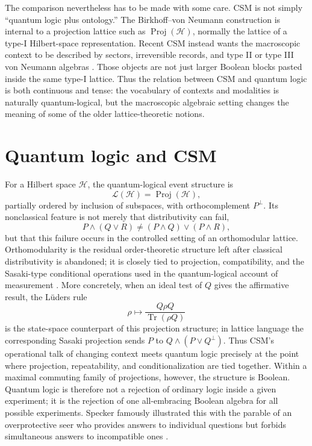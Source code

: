 \documentclass[
aps,
pra,
reprint,
superscriptaddress,
nofootinbib,
longbibliography
]{revtex4-2}
\newcommand{\Hilb}{\mathcal H}
\newcommand{\Proj}{\operatorname{Proj}}
\newcommand{\Lat}{\mathcal L}
\begin{document}
The comparison nevertheless has to be made with some care.  CSM is not simply
``quantum logic plus ontology.''  The Birkhoff--von Neumann construction is
internal to a projection lattice such as $\Proj(\Hilb)$, normally the lattice
of a type-I Hilbert-space representation.  Recent CSM instead wants the
macroscopic context to be described by sectors, irreversible records, and
type II or type III von Neumann algebras \cite{haag1996,takesaki1979}.  Those
objects are not just larger Boolean blocks pasted inside the same type-I
lattice.  Thus the relation between CSM and quantum logic is both continuous
and tense: the vocabulary of contexts and modalities is naturally
quantum-logical, but the macroscopic algebraic setting changes the meaning of
some of the older lattice-theoretic notions.

\section{Quantum logic and CSM}

For a Hilbert space $\Hilb$, the quantum-logical event structure is
\begin{equation}
\Lat(\Hilb)=\Proj(\Hilb),
\end{equation}
partially ordered by inclusion of subspaces, with orthocomplement $P^\perp$.
Its nonclassical feature is not merely that distributivity can fail,
\begin{equation}
P\wedge(Q\vee R)\neq (P\wedge Q)\vee(P\wedge R),
\end{equation}
but that this failure occurs in the controlled setting of an orthomodular
lattice.  Orthomodularity is the residual order-theoretic structure left after
classical distributivity is abandoned; it is closely tied to projection,
compatibility, and the Sasaki-type conditional operations used in the
quantum-logical account of measurement \cite{kalmbach1983,ptak1991}.  More
concretely, when an ideal test of $Q$ gives the affirmative result, the
L\"uders rule
\begin{equation}
\rho\mapsto \frac{Q\rho Q}{\operatorname{Tr}(\rho Q)}
\end{equation}
is the state-space counterpart of this projection structure; in lattice
language the corresponding Sasaki projection sends $P$ to
$Q\wedge(P\vee Q^\perp)$.  Thus CSM's operational talk of changing context
meets quantum logic precisely at the point where projection, repeatability,
and conditionalization are tied together.  Within a maximal commuting family
of projections, however, the structure is Boolean.
Quantum logic is therefore not a rejection of ordinary logic inside a given
experiment; it is the rejection of one all-embracing Boolean algebra for all
possible experiments.  Specker famously illustrated this with the parable of
an overprotective seer who provides answers to individual questions but forbids
simultaneous answers to incompatible ones \cite{specker1960}.
\end{document}
